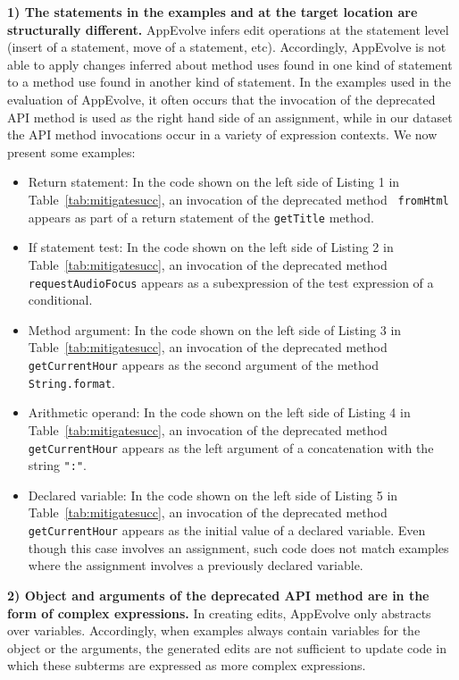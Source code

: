 \vspace{0.25\baselineskip}\noindent\textbf{1) The statements in the examples and at the target location are
 structurally different.} AppEvolve infers edit operations at the statement
 level (insert of a statement, move of a statement, etc).  Accordingly,
 AppEvolve is not able to apply changes inferred about method uses found
 in one kind of statement to a method use found in another kind of
 statement.  In the examples used in the evaluation of AppEvolve, it
 often occurs that the invocation of the deprecated API method
 is used as the right hand side of an assignment, while in our dataset the
 API method invocations occur in a variety of expression contexts.  We now
 present some examples:
\begin{itemize}
\item Return statement: 
In the code shown on the left side of Listing 1 in
Table~\ref{tab:mitigatesucc}, an invocation of the deprecated method {\tt
fromHtml} appears as part of a return statement of the {\tt getTitle}
method.

\item If statement test:
In the code shown on the left side of Listing 2 in
Table~\ref{tab:mitigatesucc}, an invocation of the deprecated method {\tt
requestAudioFocus} appears as a subexpression of the test expression of a
conditional.

\item Method argument:
In the code shown on the left side of Listing 3 in
Table~\ref{tab:mitigatesucc}, an invocation of the deprecated method {\tt
getCurrentHour} appears as the second argument of the method {\tt
String.format}.

\item Arithmetic operand:
In the code shown on the left side of Listing 4 in
Table~\ref{tab:mitigatesucc}, an invocation of the deprecated method {\tt
getCurrentHour} appears as the left argument of a concatenation with the
string {\tt ":"}.

\item Declared variable:
In the code shown on the left side of Listing 5 in
Table~\ref{tab:mitigatesucc}, an invocation of the deprecated method {\tt
getCurrentHour} appears as the initial value of a declared variable.  Even
though this case involves an assignment, such code does not match examples where
the assignment involves a previously declared variable.
\end{itemize}

\vspace{0.25\baselineskip}\noindent\textbf{2) Object and arguments of the
deprecated API method are in the form of complex expressions.} 
In creating edits, AppEvolve only abstracts over variables.  Accordingly,
when examples always contain variables for the object or the arguments, the
generated edits are not sufficient to update code in which these subterms
are expressed as more complex expressions.

